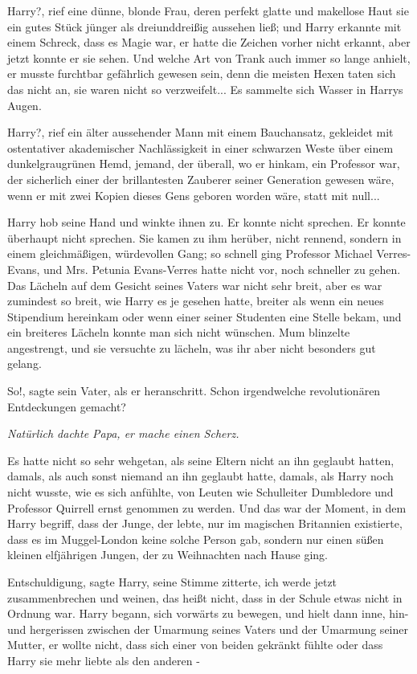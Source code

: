 \glqq{}Harry?\grqq{}, rief eine dünne, blonde Frau, deren perfekt glatte und
makellose Haut sie ein gutes Stück jünger als dreiunddreißig aussehen ließ; und
Harry erkannte mit einem Schreck, dass es Magie war, er hatte die Zeichen vorher
nicht erkannt, aber jetzt konnte er sie sehen. Und welche Art von Trank auch
immer so lange anhielt, er musste furchtbar gefährlich gewesen sein, denn die
meisten Hexen taten sich das nicht an, sie waren nicht so verzweifelt... Es
sammelte sich Wasser in Harrys Augen.

\glqq{}Harry?\grqq{}, rief ein älter aussehender Mann mit einem Bauchansatz,
gekleidet mit ostentativer akademischer Nachlässigkeit in einer schwarzen Weste
über einem dunkelgraugrünen Hemd, jemand, der überall, wo er hinkam, ein
Professor war, der sicherlich einer der brillantesten Zauberer seiner Generation
gewesen wäre, wenn er mit zwei Kopien dieses Gens geboren worden wäre, statt mit
null...

Harry hob seine Hand und winkte ihnen zu. Er konnte nicht sprechen. Er konnte
überhaupt nicht sprechen. Sie kamen zu ihm herüber, nicht rennend, sondern in
einem gleichmäßigen, würdevollen Gang; so schnell ging Professor Michael
Verres-Evans, und Mrs. Petunia Evans-Verres hatte nicht vor, noch schneller zu
gehen. Das Lächeln auf dem Gesicht seines Vaters war nicht sehr breit, aber es
war zumindest so breit, wie Harry es je gesehen hatte, breiter als wenn ein
neues Stipendium hereinkam oder wenn einer seiner Studenten eine Stelle bekam,
und ein breiteres Lächeln konnte man sich nicht wünschen. Mum blinzelte
angestrengt, und sie versuchte zu lächeln, was ihr aber nicht besonders gut
gelang.

\glqq{}So!\grqq{}, sagte sein Vater, als er heranschritt. \glqq{}Schon
irgendwelche revolutionären Entdeckungen gemacht?\grqq{}

\emph{Natürlich dachte Papa, er mache einen Scherz.}

Es hatte nicht so sehr wehgetan, als seine Eltern nicht an ihn geglaubt hatten,
damals, als auch sonst niemand an ihn geglaubt hatte, damals, als Harry noch
nicht wusste, wie es sich anfühlte, von Leuten wie Schulleiter Dumbledore und
Professor Quirrell ernst genommen zu werden. Und das war der Moment, in dem
Harry begriff, dass der Junge, der lebte, nur im magischen Britannien
existierte, dass es im Muggel-London keine solche Person gab, sondern nur einen
süßen kleinen elfjährigen Jungen, der zu Weihnachten nach Hause ging.

\glqq{}Entschuldigung\grqq{}, sagte Harry, seine Stimme zitterte, \glqq{}ich werde
jetzt zusammenbrechen und weinen, das heißt nicht, dass in der Schule etwas
nicht in Ordnung war.\grqq{} Harry begann, sich vorwärts zu bewegen, und hielt dann
inne, hin- und hergerissen zwischen der Umarmung seines Vaters und der Umarmung
seiner Mutter, er wollte nicht, dass sich einer von beiden gekränkt fühlte oder
dass Harry sie mehr liebte als den anderen -

